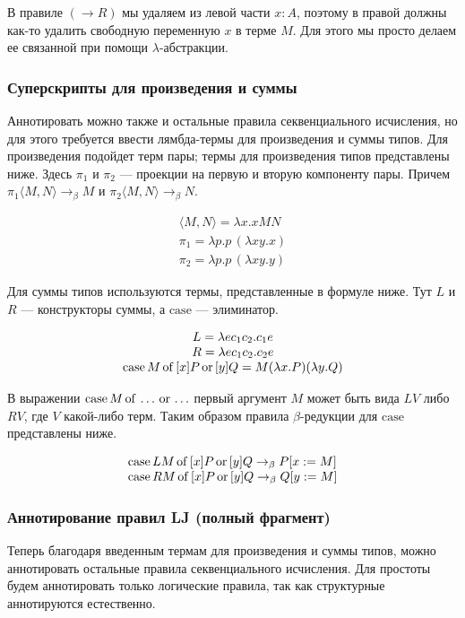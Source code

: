 \documentclass[14pt, russian]{scrartcl}
\begin{document}
В правиле $(\rightarrow R)$ мы удаляем из левой части $x : A$, поэтому в правой
должны как-то удалить свободную переменную $x$ в терме $M$. Для этого мы просто
делаем ее связанной при помощи $\lambda$-абстракции.


\subsubsection{Суперскрипты для произведения и суммы}
Аннотировать можно также и остальные правила секвенциального исчисления, но для
этого требуется ввести лямбда-термы для произведения и суммы типов. Для произведения
подойдет терм пары; термы для произведения типов представлены ниже. Здесь $\pi_1$ и $\pi_2$ --- проекции на первую и вторую компоненту пары. Причем
$ \pi_1 \langle M, N \rangle \rightarrow_\beta M$ и $\pi_2 \langle M, N \rangle
\rightarrow_\beta N$.

$$
\begin{array}{l}
\langle M, N \rangle = \lambda x.xMN \\
\pi_1 = \lambda p.p\,(\lambda xy.x) \\
\pi_2 = \lambda p.p\,(\lambda xy.y)
\end{array}$$


Для суммы типов используются термы, представленные в формуле ниже. Тут $L$ и $R$ --- конструкторы суммы, а $\mathrm{case}$ --- элиминатор. 

$$
\begin{array}{c}
L = \lambda e c_1 c_2. c_1 e \\
R = \lambda e c_1 c_2. c_2 e \\
\caseof{M}{[x]P}{[y]Q} = M(\lambda x.P)(\lambda y.Q)
\end{array}$$

В выражении
$\caseof{M}{\ldots}{\ldots}$ первый аргумент $M$ может быть вида $LV$ либо $RV$,
где $V$ какой-либо терм. Таким образом правила $\beta$-редукции для
$\mathrm{case}$ представлены ниже.


$$
\begin{array}{l}
\caseof{LM}{[x]P}{[y]Q} \rightarrow_\beta P[x := M] \\
\caseof{RM}{[x]P}{[y]Q} \rightarrow_\beta Q[y := M]
\end{array}$$

\subsubsection{Аннотирование правил LJ (полный фрагмент)}
Теперь благодаря введенным термам для произведения и суммы типов, можно аннотировать
остальные правила секвенциального исчисления. Для простоты будем аннотировать только
логические правила, так как структурные аннотируются естественно.
\end{document}
